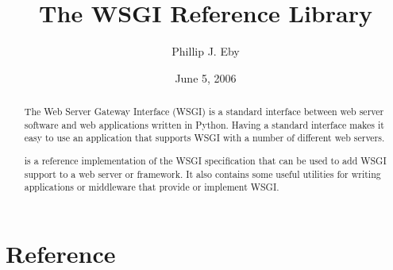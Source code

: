 \documentclass{manual}
\title{The WSGI Reference Library}
\author{Phillip J. Eby}
\date{June 5, 2006}       %
\begin{document}
\maketitle


%

\begin{abstract}
\noindent
The Web Server Gateway Interface (WSGI) is a standard interface
between web server software and web applications written in Python.
Having a standard interface makes it easy to use an application
that supports WSGI with a number of different web servers.

 is a reference implementation of the WSGI specification
that can be used to add WSGI support to a web server or framework.  It also
contains some useful utilities for writing applications or middleware that
provide or implement WSGI.
\end{abstract}

\tableofcontents

\chapter{Reference}













%
%
%
\renewcommand{\indexname}{Module Index}

\renewcommand{\indexname}{Index}
\end{document}
